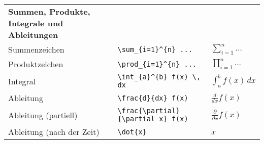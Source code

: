 \begin{table}[H]
\begin{longtable}{>{\raggedright}p{4cm} >{\raggedright}p{6cm} >{\raggedright}p{5cm}}
        \textbf{Summen, Produkte, Integrale und Ableitungen} &                                                                                         &                                      \\
        Summenzeichen                                        & \texttt{\textbackslash sum\_\{i=1\}\^{}\{n\} ...}                                       & $ \sum_{i=1}^{n} ... $               \\
        Produktzeichen                                       & \texttt{\textbackslash prod\_\{i=1\}\^{}\{n\} ...}                                      & $ \prod_{i=1}^{n} ... $              \\
        Integral                                             & \texttt{\textbackslash int\_\{a\}\^{}\{b\} f(x) \textbackslash, dx}                     & $ \int_{a}^{b} f(x) \,dx $           \\
        Ableitung                                            & \texttt{\textbackslash frac\{d\}\{dx\} f(x)}                                            & $ \frac{d}{dx} f(x) $                \\
        Ableitung (partiell)                                 & \texttt{\textbackslash frac\{\textbackslash partial\}\{\textbackslash partial x\} f(x)} & $ \frac{\partial}{\partial x} f(x) $ \\
        Ableitung (nach der Zeit)                            & \texttt{\textbackslash dot\{x\}}                                                        & $ \dot{x} $                          \\


\end{longtable}
\end{table}
